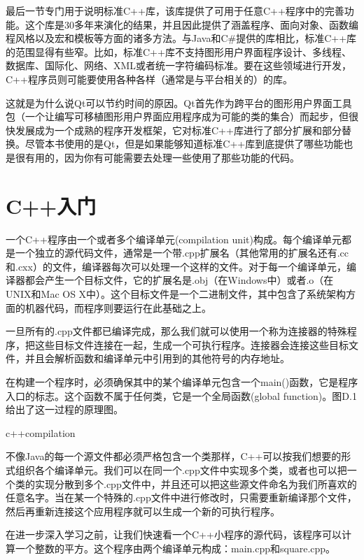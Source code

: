 \documentclass[11pt,oneside]{book}
\begin{document}
\begin{common-format}
最后一节专门用于说明标准C++库，该库提供了可用于任意C++程序中的完善功能。这个库是30多年来演化的结果，并且因此提供了涵盖程序、面向对象、函数编程风格以及宏和模板等方面的诸多方法。与Java和C\#{}提供的库相比，标准C++库的范围显得有些窄。比如，标准C++库不支持图形用户界面程序设计、多线程、数据库、国际化、网络、XML或者统一字符编码标准。要在这些领域进行开发，C++程序员则可能要使用各种各样（通常是与平台相关的）的库。

这就是为什么说Qt可以节约时间的原因。Qt首先作为跨平台的图形用户界面工具包（一个让编写可移植图形用户界面应用程序成为可能的类的集合）而起步，但很快发展成为一个成熟的程序开发框架，它对标准C++库进行了部分扩展和部分替换。尽管本书使用的是Qt，但是如果能够知道标准C++库到底提供了哪些功能也是很有用的，因为你有可能需要去处理一些使用了那些功能的代码。

\section{C++入门}
一个C++程序由一个或者多个编译单元(compilation unit)构成。每个编译单元都是一个独立的源代码文件，通常是一个带.cpp扩展名（其他常用的扩展名还有.cc和.cxx）的文件，编译器每次可以处理一个这样的文件。对于每一个编译单元，编译器都会产生一个目标文件，它的扩展名是.obj（在Windows中）或者.o（在UNIX和Mac OS X中）。这个目标文件是一个二进制文件，其中包含了系统架构方面的机器代码，而程序则要运行在此基础之上。  

一旦所有的.cpp文件都已编译完成，那么我们就可以使用一个称为连接器的特殊程序，把这些目标文件连接在一起，生成一个可执行程序。连接器会连接这些目标文件，并且会解析函数和编译单元中引用到的其他符号的内存地址。

在构建一个程序时，必须确保其中的某个编译单元包含一个main()函数，它是程序入口的标志。这个函数不属于任何类，它是一个全局函数(global function)。图D.1给出了这一过程的原理图。
\begin{fig}[0.8]{c++compilation}
\caption{C++的编译过程（在Windows中）}
\label{fig:c++compilation}
\end{fig}

不像Java的每一个源文件都必须严格包含一个类那样，C++可以按我们想要的形式组织各个编译单元。我们可以在同一个.cpp文件中实现多个类，或者也可以把一个类的实现分散到多个.cpp文件中，并且还可以把这些源文件命名为我们所喜欢的任意名字。当在某一个特殊的.cpp文件中进行修改时，只需要重新编译那个文件，然后再重新连接这个应用程序就可以生成一个新的可执行程序。

在进一步深入学习之前，让我们快速看一个C++小程序的源代码，该程序可以计算一个整数的平方。这个程序由两个编译单元构成：main.cpp和square.cpp。


\end{common-format}
\end{document}
